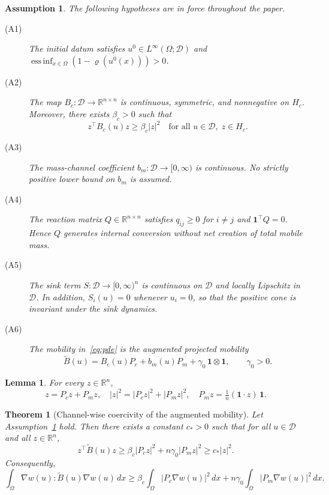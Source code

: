 \documentclass[10pt,a4paper]{amsart}
\newtheorem{assumption}{Assumption}
\newtheorem{theorem}{Theorem}
\newtheorem{lemma}{Lemma}
\newcommand{\Be}{\widetilde{B}}       %
\newcommand{\D}{\mathcal{D}}
\newcommand{\Hc}{H_c}                 %
\newcommand{\Pc}{P_c}                 %
\newcommand{\Pm}{P_m}                 %
\newcommand{\R}{\mathbb{R}}
\newcommand{\bone}{\mathbf{1}}
\begin{document}
\begin{assumption}\label{ass}
The following hypotheses are in force throughout the paper.
\begin{description}
  \item[(A1)] The initial datum satisfies
    $u^0\in L^\infty(\Omega;\D)$ and
    $\operatorname{ess\,inf}_{x\in\Omega}(1-\varrho(u^0(x)))>0$.
  \item[(A2)] The map $B_c:\D\to\R^{n\times n}$ is continuous,
    symmetric, and nonnegative on $\Hc$. Moreover, there exists
    $\beta_c>0$ such that
    \[
      z^\top B_c(u)z \ge \beta_c|z|^2
      \quad\text{for all }u\in\D,\; z\in\Hc.
    \]
  \item[(A3)] The mass-channel coefficient $b_m:\D\to[0,\infty)$ is
    continuous. No strictly positive lower bound on $b_m$ is assumed.
  \item[(A4)] The reaction matrix $Q\in\R^{n\times n}$ satisfies
    $q_{ij}\ge 0$ for $i\ne j$ and $\bone^\top Q=0$. Hence $Q$
    generates internal conversion without net creation of total mobile
    mass.
  \item[(A5)] The sink term $S:\D\to[0,\infty)^n$ is continuous on
    $\D$ and locally Lipschitz in $\D$. In addition,
    $S_i(u)=0$ whenever $u_i=0$, so that the positive cone is
    invariant under the sink dynamics.
  \item[(A6)] The mobility in~\eqref{eq:pde} is the augmented
    projected mobility
    \[
      \Be(u) = B_c(u)\Pc + b_m(u)\Pm + \gamma_0\,\bone\otimes\bone,
      \qquad \gamma_0>0.
    \]
\end{description}
\end{assumption}

\begin{lemma}\label{lem:decomp}
For every $z\in\R^n$,
\[
  z = \Pc z + \Pm z,\quad
  |z|^2 = |\Pc z|^2 + |\Pm z|^2,\quad
  \Pm z = \tfrac{1}{n}(\bone\cdot z)\,\bone.
\]
\end{lemma}

\begin{theorem}[Channel-wise coercivity of the augmented mobility]
\label{thm:coer}
Let Assumption~\ref{ass} hold. Then there exists a constant $c_*>0$
such that for all $u\in\D$ and all $z\in\R^n$,
\begin{equation}\label{eq:coer}
  z^\top\Be(u)z \ge \beta_c|\Pc z|^2 + n\gamma_0|\Pm z|^2 \ge c_*|z|^2.
\end{equation}
Consequently,
\begin{equation}\label{eq:coer_int}
  \int_\Omega \nabla w(u):\Be(u)\nabla w(u)\,dx
  \ge \beta_c\int_\Omega|\Pc\nabla w(u)|^2\,dx
    + n\gamma_0\int_\Omega|\Pm\nabla w(u)|^2\,dx.
\end{equation}
\end{theorem}
\end{document}
